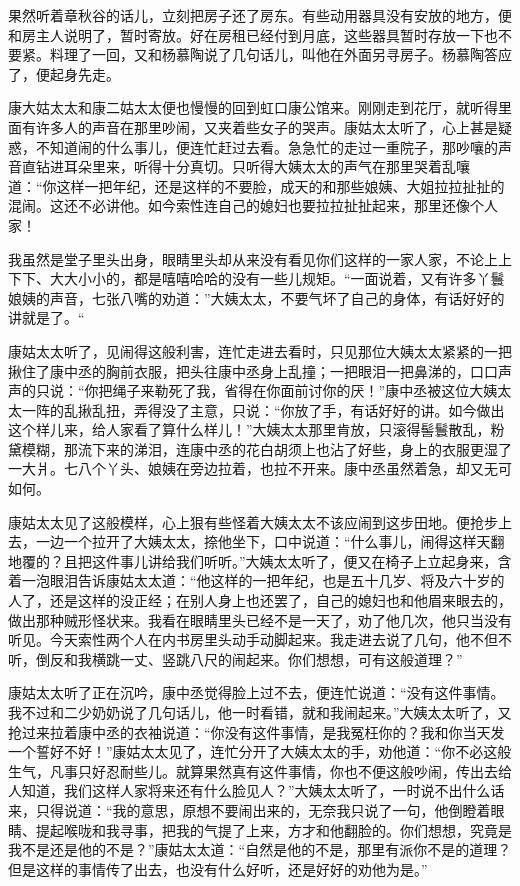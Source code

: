 \documentclass[12pt,UTF8]{ctexbook}
\begin{document}
{{{果然听着章秋谷的话儿，立刻把房子还了房东。有些动用器具没有安放的地方，便和房主人说明了，暂时寄放。好在房租已经付到月底，这些器具暂时存放一下也不要紧。料理了一回，又和杨慕陶说了几句话儿，叫他在外面另寻房子。杨慕陶答应了，便起身先走。

康大姑太太和康二姑太太便也慢慢的回到虹口康公馆来。刚刚走到花厅，就听得里面有许多人的声音在那里吵闹，又夹着些女子的哭声。康姑太太听了，心上甚是疑惑，不知道闹的什么事儿，便连忙赶过去看。急急忙的走过一重院子，那吵嚷的声音直钻进耳朵里来，听得十分真切。只听得大姨太太的声气在那里哭着乱嚷道：“你这样一把年纪，还是这样的不要脸，成天的和那些娘姨、大姐拉拉扯扯的混闹。这还不必讲他。如今索性连自己的媳妇也要拉拉扯扯起来，那里还像个人家！

我虽然是堂子里头出身，眼睛里头却从来没有看见你们这样的一家人家，不论上上下下、大大小小的，都是嘻嘻哈哈的没有一些儿规矩。“一面说着，又有许多丫鬟娘姨的声音，七张八嘴的劝道：”大姨太太，不要气坏了自己的身体，有话好好的讲就是了。“

康姑太太听了，见闹得这般利害，连忙走进去看时，只见那位大姨太太紧紧的一把揪住了康中丞的胸前衣服，把头往康中丞身上乱撞；一把眼泪一把鼻涕的，口口声声的只说：“你把绳子来勒死了我，省得在你面前讨你的厌！”康中丞被这位大姨太太一阵的乱揪乱扭，弄得没了主意，只说：“你放了手，有话好好的讲。如今做出这个样儿来，给人家看了算什么样儿！”大姨太太那里肯放，只滚得髻鬟散乱，粉黛模糊，那流下来的涕泪，连康中丞的花白胡须上也沾了好些，身上的衣服更湿了一大爿。七八个丫头、娘姨在旁边拉着，也拉不开来。康中丞虽然着急，却又无可如何。

康姑太太见了这般模样，心上狠有些怪着大姨太太不该应闹到这步田地。便抢步上去，一边一个拉开了大姨太太，捺他坐下，口中说道：“什么事儿，闹得这样天翻地覆的？且把这件事儿讲给我们听听。”大姨太太听了，便又在椅子上立起身来，含着一泡眼泪告诉康姑太太道：“他这样的一把年纪，也是五十几岁、将及六十岁的人了，还是这样的没正经；在别人身上也还罢了，自己的媳妇也和他眉来眼去的，做出那种贼形怪状来。我看在眼睛里头已经不是一天了，劝了他几次，他只当没有听见。今天索性两个人在内书房里头动手动脚起来。我走进去说了几句，他不但不听，倒反和我横跳一丈、竖跳八尺的闹起来。你们想想，可有这般道理？”

康姑太太听了正在沉吟，康中丞觉得脸上过不去，便连忙说道：“没有这件事情。我不过和二少奶奶说了几句话儿，他一时看错，就和我闹起来。”大姨太太听了，又抢过来拉着康中丞的衣袖说道：“你没有这件事情，是我冤枉你的？我和你当天发一个誓好不好！”康姑太太见了，连忙分开了大姨太太的手，劝他道：“你不必这般生气，凡事只好忍耐些儿。就算果然真有这件事情，你也不便这般吵闹，传出去给人知道，我们这样人家将来还有什么脸见人？”大姨太太听了，一时说不出什么话来，只得说道：“我的意思，原想不要闹出来的，无奈我只说了一句，他倒瞪着眼睛、提起喉咙和我寻事，把我的气提了上来，方才和他翻脸的。你们想想，究竟是我不是还是他的不是？”康姑太太道：“自然是他的不是，那里有派你不是的道理？但是这样的事情传了出去，也没有什么好听，还是好好的劝他为是。”

}}}
\end{document}
